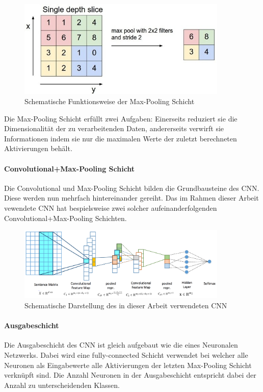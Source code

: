 \begin{figure}[H]
	\centering
	\includegraphics[width=10cm]{img/max_pooling}
	\caption{Schematische Funktionsweise der Max-Pooling Schicht}
\end{figure}

Die Max-Pooling Schicht erfüllt zwei Aufgaben: Einerseits reduziert sie die Dimensionalität der zu verarbeitenden Daten, andererseits verwirft sie  Informationen indem sie nur die maximalen Werte der zuletzt berechneten Aktivierungen behält.

\paragraph{Convolutional+Max-Pooling Schicht} Die Convolutional und Max-Pooling Schicht bilden die Grundbausteine des CNN. Diese werden nun mehrfach hintereinander gereiht. Das im Rahmen dieser Arbeit vewendete CNN hat bespielsweise zwei solcher aufeinanderfolgenden Convolutional+Max-Pooling Schichten.

\begin{figure}[h]
	\centering
	\includegraphics[width=10cm]{img/semeval_cnn_structure}
	\caption{Schematische Darstellung des in dieser Arbeit verwendeten CNN \protect\cite{deriu2016swisscheese}}
\end{figure}

\paragraph{Ausgabeschicht}\label{basic:cnn:output_layer} Die Ausgabeschicht des CNN ist gleich aufgebaut wie die eines  Neuronalen Netzwerks. Dabei wird eine fully-connected Schicht verwendet bei welcher alle Neuronen als Eingabewerte alle Aktivierungen der letzten Max-Pooling Schicht verknüpft sind. Die Anzahl Neuronen in der Ausgabeschicht entspricht dabei der Anzahl zu unterscheidenden Klassen.

